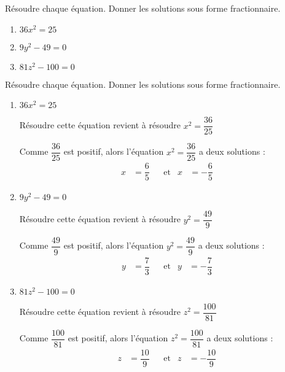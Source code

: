 \begin{exercice*}
    Résoudre chaque équation. Donner les solutions sous forme fractionnaire.
    \begin{enumerate}
        \item $36x^2=25$
        \item $9y^2-49=0$
        \item $81z^2-100=0$
    \end{enumerate}
\end{exercice*}
\begin{corrige}
    Résoudre chaque équation. Donner les solutions sous forme fractionnaire.

    \begin{enumerate}
        \item $36x^2=25$
        
        Résoudre cette équation revient à résoudre $x^2=\dfrac{36}{25}$

        Comme $\dfrac{36}{25}$ est positif, alors l’équation $x^2=\dfrac{36}{25}$ a deux solutions :
        \begin{align*}
            x&=\dfrac{6}{5}&&\text{et}&x&=-\dfrac{6}{5}%
        \end{align*}
        \item $9y^2-49=0$
        
        Résoudre cette équation revient à résoudre $y^2=\dfrac{49}{9}$

        Comme $\dfrac{49}{9}$ est positif, alors l’équation $y^2=\dfrac{49}{9}$ a deux solutions :
        \begin{align*}
            y&=\dfrac{7}{3}&&\text{et}&y&=-\dfrac{7}{3}%
        \end{align*}
        \item $81z^2-100=0$
        
        Résoudre cette équation revient à résoudre $z^2=\dfrac{100}{81}$

        Comme $\dfrac{100}{81}$ est positif, alors l’équation $z^2=\dfrac{100}{81}$ a deux solutions :
        \begin{align*}
            z&=\dfrac{10}{9}&&\text{et}&z&=-\dfrac{10}{9}%
        \end{align*}
    \end{enumerate}
\end{corrige}
